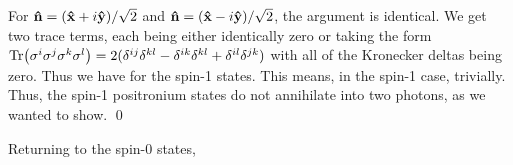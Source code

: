 \documentclass[11pt]{article}
\begin{document}
{	For $\vb{\hat{n}} = (\vb{\hat{x}} + i \vb{\hat{y}}) / \sqrt{2}$ and $\vb{\hat{n}} = (\vb{\hat{x}} - i \vb{\hat{y}}) / \sqrt{2}$, the argument is identical.  We get two trace terms, each being either identically zero or taking the form $\Tr(\sigma^i \sigma^j \sigma^k \sigma^l) = 2 (\delta^{i j} \delta^{k l} - \delta^{i k} \delta^{k l} + \delta^{i l} \delta^{j k})$ with all of the Kronecker deltas being zero.  Thus we have
	for the spin-1 states.  This means, in the spin-1 case,
	trivially.  Thus, the spin-1 positronium states do not annihilate into two photons, as we wanted to show. \qed
	
	Returning to the spin-0 states, 
}


\makebib
\end{document}
